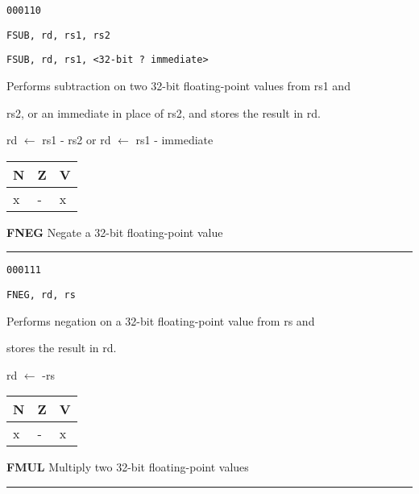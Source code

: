 \documentclass{article}
\begin{document}
{\large
	 \texttt{000110} \par
	\smallbreak
	 \texttt{FSUB, rd, rs1, rs2} \par
	\smallbreak
	 \texttt{FSUB, rd, rs1, <32-bit ? immediate>} \par
	\smallbreak
	 Performs subtraction on two 32-bit floating-point values from rs1 and \par
	\makebox[3.5cm][l]{  } rs2, or an immediate in place of rs2, and stores the result in rd. \par
	\smallbreak
	 rd $\leftarrow$ rs1 - rs2 \quad or \quad rd $\leftarrow$ rs1 - immediate\par
	\smallbreak
	 \begin{tabular}{lll} N \quad & Z \quad & V \\ \hline x & - & x \\ \end{tabular}
}

\bigskip\bigskip

\flushleft
\LARGE\textbf{FNEG} \large \hfill Negate a 32-bit floating-point value

\kern-3pt
\noindent\rule{16.5cm}{0.4pt}
\normalsize

{\large
	 \texttt{000111} \par
	\smallbreak
	 \texttt{FNEG, rd, rs} \par
	\smallbreak
	 Performs negation on a 32-bit floating-point value from rs and \par
	\makebox[3.5cm][l]{  } stores the result in rd. \par
	\smallbreak
	 rd $\leftarrow$ -rs \par 
	\smallbreak
	 \begin{tabular}{lll} N \quad & Z \quad & V \\ \hline x & - & x \\ \end{tabular}
}

\pagebreak

\flushleft
\LARGE\textbf{FMUL} \large \hfill Multiply two 32-bit floating-point values

\kern-3pt
\noindent\rule{16.5cm}{0.4pt}
\normalsize
\end{document}
